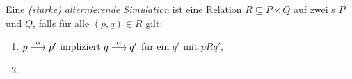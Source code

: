 \begin{Def}[Simulation]
  Eine \emph{(starke) alternierende Simulation} ist eine Relation $R\subseteq P
  \times Q$ auf zwei \MEIO{}s $P$ und $Q$, falls für alle $(p,q)\in R$ gilt:
  \begin{enumerate}
    \item $p\must[\alpha] p'$ impliziert $q\must[\alpha] q'$ für ein $q'$ mit
      $pRq'$,
    \item \TODO{$\may$}
  \end{enumerate}
\end{Def}
